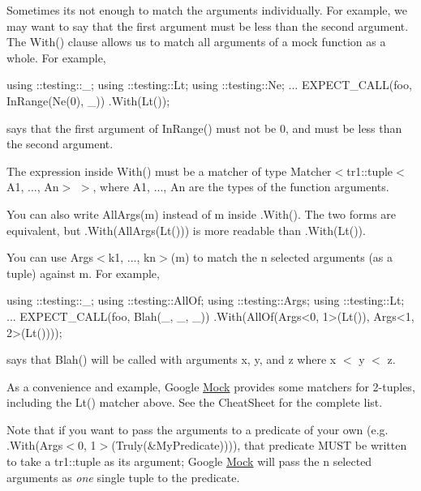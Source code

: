 Sometimes it\textquotesingle{}s not enough to match the arguments individually. For example, we may want to say that the first argument must be less than the second argument. The {\ttfamily With()} clause allows us to match all arguments of a mock function as a whole. For example,


\begin{DoxyCode}
using ::testing::\_;
using ::testing::Lt;
using ::testing::Ne;
...
  EXPECT\_CALL(foo, InRange(Ne(0), \_))
      .With(Lt());
\end{DoxyCode}


says that the first argument of {\ttfamily In\+Range()} must not be 0, and must be less than the second argument.

The expression inside {\ttfamily With()} must be a matcher of type {\ttfamily Matcher$<$tr1\+::tuple$<$A1, ..., An$>$ $>$}, where {\ttfamily A1}, ..., {\ttfamily An} are the types of the function arguments.

You can also write {\ttfamily All\+Args(m)} instead of {\ttfamily m} inside {\ttfamily .With()}. The two forms are equivalent, but {\ttfamily .With(All\+Args(\+Lt()))} is more readable than {\ttfamily .With(\+Lt())}.

You can use {\ttfamily Args$<$k1, ..., kn$>$(m)} to match the {\ttfamily n} selected arguments (as a tuple) against {\ttfamily m}. For example,


\begin{DoxyCode}
using ::testing::\_;
using ::testing::AllOf;
using ::testing::Args;
using ::testing::Lt;
...
  EXPECT\_CALL(foo, Blah(\_, \_, \_))
      .With(AllOf(Args<0, 1>(Lt()), Args<1, 2>(Lt())));
\end{DoxyCode}


says that {\ttfamily Blah()} will be called with arguments {\ttfamily x}, {\ttfamily y}, and {\ttfamily z} where {\ttfamily x $<$ y $<$ z}.

As a convenience and example, Google \hyperlink{class_mock}{Mock} provides some matchers for 2-\/tuples, including the {\ttfamily Lt()} matcher above. See the Cheat\+Sheet for the complete list.

Note that if you want to pass the arguments to a predicate of your own (e.\+g. {\ttfamily .With(Args$<$0, 1$>$(Truly(\&\+My\+Predicate)))}), that predicate M\+U\+ST be written to take a {\ttfamily tr1\+::tuple} as its argument; Google \hyperlink{class_mock}{Mock} will pass the {\ttfamily n} selected arguments as {\itshape one} single tuple to the predicate.

